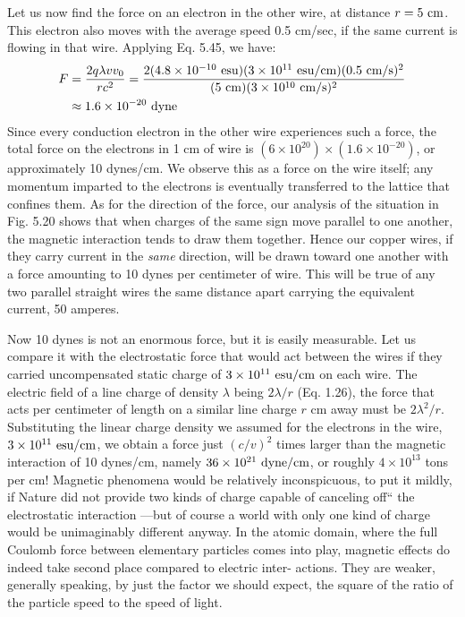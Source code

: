 Let us now find the force on an electron in the other wire, at
distance $r = 5\ \textup{cm}$. This electron also moves with the average speed
0.5 cm/sec, if the same current is flowing in that wire. Applying
Eq. 5.45, we have:
\begin{align}
\begin{split}
  F &= \frac{2q\lambda v v_0}{rc^2}
     = \frac{2(4.8\times10^{-10}\ \esu)(3\times10^{11}\ \esu/\cmunit)(0.5\ \cmunit/\sunit)^2}
            {(5\ \cmunit)(3\times10^{10}\ \cmunit/\sunit)^2} \\
    &\approx 1.6\times 10^{-20}\ \zu{dyne}
\end{split}
\end{align}
Since every conduction electron in the other wire experiences such
a force, the total force on the electrons in 1 cm of wire is 
$(6 \times 10^{20}) \times (1.6 \times 10^{-20})$,
or approximately 10 dynes/cm. We observe this as
a force on the wire itself; any momentum imparted to the electrons
is eventually transferred to the lattice that confines them. As for the
direction of the force, our analysis of the situation in Fig. 5.20 shows
that when charges of the same sign move parallel to one another, the
magnetic interaction tends to draw them together. Hence our copper
wires, if they carry current in the \emph{same} direction, will be drawn toward
one another with a force amounting to 10 dynes per centimeter of
wire. This will be true of any two parallel straight wires the same distance
apart carrying the equivalent current, 50 amperes.

Now 10 dynes is not an enormous force, but it is easily measurable.
Let us compare it with the electrostatic force that would act between
the wires if they carried uncompensated static charge of 
$3 \times 10^{11}\ \esu/\cmunit$ on each wire. The electric field of a line charge of density
$\lambda$ being $2\lambda/r$ (Eq. 1.26), the force that acts per centimeter of length
on a similar line charge $r$ cm away must be $2\lambda^2/r$. Substituting the
linear charge density we assumed for the electrons in the wire,
$3 \times 10^{11}\ \esu/\cmunit$, we obtain a force just $(c/v)^2$ times larger than the
magnetic interaction of 10 dynes/cm, namely $36 \times 10^{21}\ \textup{dyne}/\textup{cm}$,
or roughly $4 \times 10^{13}$ tons per cm! Magnetic phenomena would be relatively
inconspicuous, to put it mildly, if Nature did not provide two
kinds of charge capable of canceling off`` the electrostatic interaction
---but of course a world with only one kind of charge would be unimaginably
different anyway. In the atomic domain, where the full
Coulomb force between elementary particles comes into play, magnetic
effects do indeed take second place compared to electric inter-
actions. They are weaker, generally speaking, by just the factor we
should expect, the square of the ratio of the particle speed to the
speed of light.

